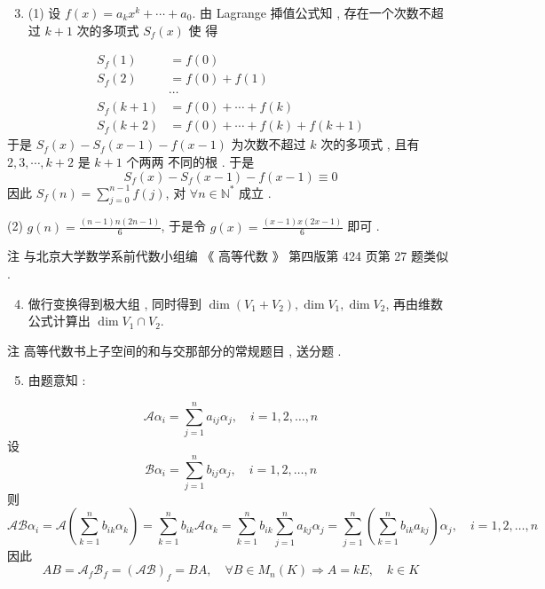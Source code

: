 \documentclass[10pt]{article}
\begin{document}
\begin{enumerate}
  \setcounter{enumi}{2}
  \item (1)  设  $f(x)=a_{k} x^{k}+\cdots+a_{0}$.  由  Lagrange  揷值公式知 ,  存在一个次数不超过  $k+1$  次的多项式  $S_{f}(x)$  使   得 
\end{enumerate}
$$
\begin{aligned}
S_{f}(1) &=f(0) \\
S_{f}(2) &=f(0)+f(1) \\
& \cdots \\
S_{f}(k+1) &=f(0)+\cdots+f(k) \\
S_{f}(k+2) &=f(0)+\cdots+f(k)+f(k+1)
\end{aligned}
$$
 于是  $S_{f}(x)-S_{f}(x-1)-f(x-1)$  为次数不超过  $k$  次的多项式 ,  且有  $2,3, \cdots, k+2$  是  $k+1$  个两两   不同的根 .  于是 
$$
S_{f}(x)-S_{f}(x-1)-f(x-1) \equiv 0
$$
 因此  $S_{f}(n)=\sum_{j=0}^{n-1} f(j)$,  对  $\forall n \in \mathbb{N}^{*}$  成立 .

(2) $g(n)=\frac{(n-1) n(2 n-1)}{6}$,  于是令  $g(x)=\frac{(x-1) x(2 x-1)}{6}$  即可 .

 注   与北京大学数学系前代数小组编 《 高等代数 》 第四版第  424  页第  27  题类似 .

\begin{enumerate}
  \setcounter{enumi}{3}
  \item  做行变换得到极大组 ,  同时得到  $\operatorname{dim}\left(V_{1}+V_{2}\right), \operatorname{dim} V_{1}, \operatorname{dim} V_{2}$,  再由维数公式计算出  $\operatorname{dim} V_{1} \cap V_{2}$.
\end{enumerate}
 注   高等代数书上子空间的和与交那部分的常规题目 ,  送分题 .

\begin{enumerate}
  \setcounter{enumi}{4}
  \item  由题意知 :
\end{enumerate}
$$
\mathscr{A} \alpha_{i}=\sum_{j=1}^{n} a_{i j} \alpha_{j}, \quad i=1,2, \ldots, n
$$
 设 
$$
\mathscr{B} \alpha_{i}=\sum_{j=1}^{n} b_{i j} \alpha_{j}, \quad i=1,2, \ldots, n
$$
 则 
$$
\mathscr{A} \mathscr{B} \alpha_{i}=\mathscr{A}\left(\sum_{k=1}^{n} b_{i k} \alpha_{k}\right)=\sum_{k=1}^{n} b_{i k} \mathscr{A} \alpha_{k}=\sum_{k=1}^{n} b_{i k} \sum_{j=1}^{n} a_{k j} \alpha_{j}=\sum_{j=1}^{n}\left(\sum_{k=1}^{n} b_{i k} a_{k j}\right) \alpha_{j}, \quad i=1,2, \ldots, n
$$
 因此 
$$
A B=\mathscr{A}_{f} \mathscr{B}_{f}=(\mathscr{A} \mathscr{B})_{f}=B A, \quad \forall B \in M_{n}(K) \Longrightarrow A=k E, \quad k \in K
$$
\end{document}
